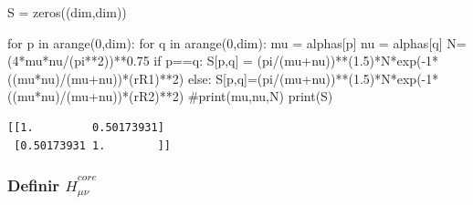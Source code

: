 \documentclass[
  letterpaper,
  DIV=11,
  numbers=noendperiod]{scrreprt}
\newenvironment{Shaded}{\begin{snugshade}}{\end{snugshade}}
\newcommand{\BuiltInTok}[1]{\textcolor[rgb]{0.00,0.23,0.31}{#1}}
\newcommand{\CommentTok}[1]{\textcolor[rgb]{0.37,0.37,0.37}{#1}}
\newcommand{\ControlFlowTok}[1]{\textcolor[rgb]{0.00,0.23,0.31}{#1}}
\newcommand{\DecValTok}[1]{\textcolor[rgb]{0.68,0.00,0.00}{#1}}
\newcommand{\FloatTok}[1]{\textcolor[rgb]{0.68,0.00,0.00}{#1}}
\newcommand{\KeywordTok}[1]{\textcolor[rgb]{0.00,0.23,0.31}{#1}}
\newcommand{\NormalTok}[1]{\textcolor[rgb]{0.00,0.23,0.31}{#1}}
\newcommand{\OperatorTok}[1]{\textcolor[rgb]{0.37,0.37,0.37}{#1}}
\begin{document}
\begin{Shaded}
\begin{Highlighting}[]
\NormalTok{S }\OperatorTok{=}\NormalTok{ zeros((dim,dim))}

\ControlFlowTok{for}\NormalTok{ p }\KeywordTok{in}\NormalTok{ arange(}\DecValTok{0}\NormalTok{,dim):}
    \ControlFlowTok{for}\NormalTok{ q }\KeywordTok{in}\NormalTok{ arange(}\DecValTok{0}\NormalTok{,dim):}
\NormalTok{        mu }\OperatorTok{=}\NormalTok{ alphas[p]}
\NormalTok{        nu }\OperatorTok{=}\NormalTok{ alphas[q]}
\NormalTok{        N}\OperatorTok{=}\NormalTok{(}\DecValTok{4}\OperatorTok{*}\NormalTok{mu}\OperatorTok{*}\NormalTok{nu}\OperatorTok{/}\NormalTok{(pi}\OperatorTok{**}\DecValTok{2}\NormalTok{))}\OperatorTok{**}\FloatTok{0.75}
        \ControlFlowTok{if}\NormalTok{ p}\OperatorTok{==}\NormalTok{q:}
\NormalTok{            S[p,q] }\OperatorTok{=}\NormalTok{ (pi}\OperatorTok{/}\NormalTok{(mu}\OperatorTok{+}\NormalTok{nu))}\OperatorTok{**}\NormalTok{(}\FloatTok{1.5}\NormalTok{)}\OperatorTok{*}\NormalTok{N}\OperatorTok{*}\NormalTok{exp(}\OperatorTok{{-}}\DecValTok{1}\OperatorTok{*}\NormalTok{((mu}\OperatorTok{*}\NormalTok{nu)}\OperatorTok{/}\NormalTok{(mu}\OperatorTok{+}\NormalTok{nu))}\OperatorTok{*}\NormalTok{(rR1)}\OperatorTok{**}\DecValTok{2}\NormalTok{)}
        \ControlFlowTok{else}\NormalTok{:}
\NormalTok{            S[p,q]}\OperatorTok{=}\NormalTok{(pi}\OperatorTok{/}\NormalTok{(mu}\OperatorTok{+}\NormalTok{nu))}\OperatorTok{**}\NormalTok{(}\FloatTok{1.5}\NormalTok{)}\OperatorTok{*}\NormalTok{N}\OperatorTok{*}\NormalTok{exp(}\OperatorTok{{-}}\DecValTok{1}\OperatorTok{*}\NormalTok{((mu}\OperatorTok{*}\NormalTok{nu)}\OperatorTok{/}\NormalTok{(mu}\OperatorTok{+}\NormalTok{nu))}\OperatorTok{*}\NormalTok{(rR2)}\OperatorTok{**}\DecValTok{2}\NormalTok{)}
        \CommentTok{\#print(mu,nu,N)}
\BuiltInTok{print}\NormalTok{(S)}
\end{Highlighting}
\end{Shaded}

\begin{verbatim}
[[1.         0.50173931]
 [0.50173931 1.        ]]
\end{verbatim}

\hypertarget{definir-hathcore_mu-nu}{%
\subsubsection{\texorpdfstring{Definir
\(\hat{H}^{core}_{\mu \nu}\)}{Definir \textbackslash hat\{H\}\^{}\{core\}\_\{\textbackslash mu \textbackslash nu\}}}\label{definir-hathcore_mu-nu}}
\end{document}
